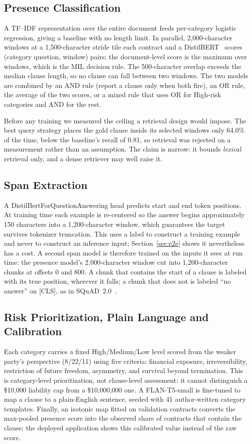 \documentclass[journal]{IEEEtran}
\begin{document}
\subsection{Presence Classification}
A TF--IDF representation over the entire document feeds per-category logistic regression, giving a
baseline with no length limit. In parallel, 2,000-character windows at a 1,500-character stride tile
each contract and a DistilBERT~\cite{distilbert} scores (category question, window) pairs; the
document-level score is the maximum over windows, which is the MIL decision rule. The
500-character overlap exceeds the median clause length, so no clause can fall between two windows.
The two models are combined by an AND rule (report a clause only when both fire), an OR rule, the
average of the two scores, or a mixed rule that uses OR for High-risk categories and AND for the
rest.

Before any training we measured the ceiling a retrieval design would impose. The best query
strategy places the gold clause inside its selected windows only 64.0\% of the time, below the
baseline's recall of 0.81, so retrieval was rejected on a measurement rather than an assumption.
The claim is narrow: it bounds \emph{lexical} retrieval only, and a dense retriever may well raise
it.

\subsection{Span Extraction}
\label{sec:stage2}
A DistilBertForQuestionAnswering head predicts start and end token positions. At training time each
example is re-centered so the answer begins approximately 150 characters into a 1,200-character
window, which guarantees the target survives tokenizer truncation. This uses a label to construct a
training example and never to construct an inference input; Section~\ref{sec:e2e} shows it
nevertheless has a cost. A second span model is therefore trained on the inputs it sees at run time:
the presence model's 2,000-character window cut into 1,200-character chunks at offsets 0 and 800.
A chunk that contains the start of a clause is labeled with its true position, wherever it falls;
a chunk that does not is labeled ``no answer'' on [CLS], as in SQuAD~2.0~\cite{squad2}.

\subsection{Risk Prioritization, Plain Language and Calibration}
Each category carries a fixed High/Medium/Low level scored from the weaker party's perspective
(8/22/11) using five criteria: financial exposure, irreversibility, restriction of future freedom,
asymmetry, and survival beyond termination. This is category-level prioritization, not clause-level
assessment: it cannot distinguish a \$10,000 liability cap from a \$10,000,000 one. A FLAN-T5-small
is fine-tuned to map a clause to a plain-English sentence, seeded with 41 author-written category
templates. Finally, an isotonic map fitted on validation contracts converts the max-pooled
presence score into the observed share of contracts that contain the clause; the deployed
application shows this calibrated value instead of the raw score.
\end{document}
